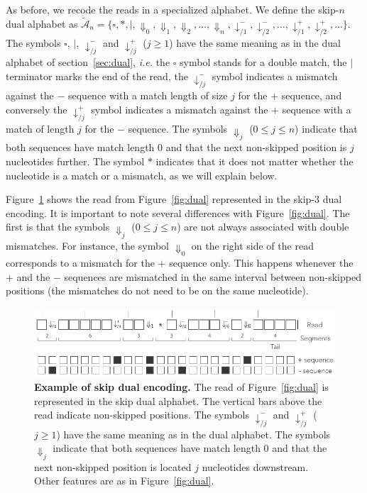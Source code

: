 \documentclass{article}
\begin{document}
As before, we recode the reads in a specialized alphabet. We define the
skip-$n$ dual alphabet as $\tilde{\mathcal{A}}_n = \{\square, *, |,
\Downarrow_0, \Downarrow_1, \Downarrow_2, \ldots, \Downarrow_n,
\downarrow^-_{/1}, \downarrow^-_{/2}, \ldots, \downarrow^+_{/1},
\downarrow^+_{/2}, \ldots\}$. The symbols $\square$, $|$,
$\downarrow^-_{/j}$ and $\downarrow^+_{/j}$ ($j \geq 1$) have the same
meaning as in the dual alphabet of section~\ref{sec:dual}, \textit{i.e.}
the $\square$ symbol stands for a double match, the $|$ terminator marks
the end of the read, the $\downarrow^-_{/j}$ symbol indicates a mismatch
against the $-$ sequence with a match length of size $j$ for the $+$
sequence, and conversely the $\downarrow^+_{/j}$ symbol indicates a
mismatch against the $+$ sequence with a match of length $j$ for the $-$
sequence. The symbols $\Downarrow_j$ ($0 \leq j \leq n$) indicate that
both sequences have match length 0 and that the next non-skipped position
is $j$ nucleotides further. The symbol $*$ indicates that it does not
matter whether the nucleotide is a match or a mismatch, as we will explain
below.
 
Figure~\ref{fig:skip_dual} shows the read from Figure~\ref{fig:dual}
represented in the skip-3 dual encoding. It is important to note several
differences with Figure~\ref{fig:dual}. The first is that the symbols
$\Downarrow_j$ ($0 \leq j \leq n$) are not always associated with double
mismatches. For instance, the symbol $\Downarrow_0$ on the right side of
the read corresponds to a mismatch for the $+$ sequence only. This happens
whenever the $+$ and the $-$ sequences are mismatched in the same interval
between non-skipped positions (the mismatches do not need to be on the
same nucleotide).

\begin{figure}[h]
\centering
\includegraphics[scale=0.85]{sketch_skip_dual.pdf}
\caption{\textbf{Example of skip dual encoding.}
The read of Figure~\ref{fig:dual} is represented in the skip dual alphabet.
The vertical bars above the read indicate non-skipped positions. The
symbols $\downarrow_{/j}^-$ and $\downarrow_{/j}^+$ ($j \geq 1$) have the
same meaning as in the dual alphabet. The symbols $\Downarrow_j$ indicate
that both sequences have match length 0 and that the next non-skipped
position is located $j$ nucleotides downstream. Other features are as in
Figure~\ref{fig:dual}.}
\label{fig:skip_dual}
\end{figure}
\end{document}
